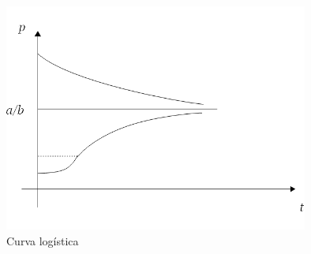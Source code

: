 \documentclass[blue]{beamer}
\numberwithin{equation}{section}
\begin{document}
%	

%	

\begin{frame}{}
		\begin{figure}[ht!]
		\centering
		\includegraphics[width=10cm]{Figura1}
		\caption{Curva logística}
	\end{figure}
\end{frame}
\end{document}
